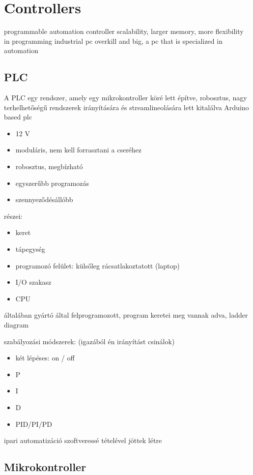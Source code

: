 \documentclass{article}
\begin{document}
	\section{Controllers}
	
	programmable automation controller scalability, larger memory, more flexibility in programming
	industrial pc overkill and big, a pc that is specialized in automation
		
	\subsection{PLC}
	
	A PLC egy rendszer, amely egy mikrokontroller köré lett építve, robosztus, nagy terhelhetőségű rendszerek irányítására és streamlineolására lett kitalálva
	Arduino based plc
	
	\begin{itemize}
		\item 12 V
		\item moduláris, nem kell forrasztani a cseréhez
		\item robosztus, megbízható
		\item egyszerűbb programozás
		\item szennyeződésállóbb
	\end{itemize}
	
	részei:
	\begin{itemize}
		\item keret
		\item tápegység
		\item programozó felület: külsőleg rácsatlakoztatott (laptop)
		\item I/O szakasz
		\item CPU
	\end{itemize}
	
	általában gyártó által felprogramozott, program keretei meg vannak adva, ladder diagram
	
	szabályozási módszerek: (igazából én irányítást csinálok)
	\begin{itemize}
		\item két lépéses: on / off
		\item P
		\item I
		\item D
		\item PID/PI/PD
	\end{itemize}	
	
	
	ipari automatizáció szoftveressé tételével jöttek létre
	
	\subsection{Mikrokontroller}
	
\end{document}
